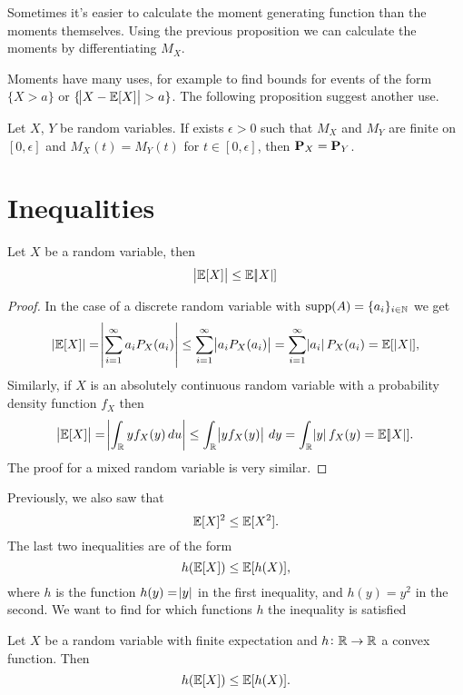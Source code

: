 \documentclass[11pt,a4paper]{article}
\begin{document}
  \begin{remark}
    Sometimes it's easier to calculate the moment generating function than
    the moments themselves. Using the previous proposition we can calculate
    the moments by differentiating $M_X$.
  \end{remark}

  Moments have many uses, for example to find bounds for events of the
  form $\{X > a\}$ or $\{\abs{X - \mathbb{E}[X]} > a\}$. The following
  proposition suggest another use.

  \begin{proposition}
    Let $X$, $Y$ be random variables. If exists $\epsilon > 0$ such that 
    $M_X$ and $M_Y$ are finite on $[0,\epsilon]$ and $M_X(t) = M_Y(t)$
    for $t \in [0,\epsilon]$, then $\mathbf{P}_X = \mathbf{P}_Y$.
  \end{proposition}

  \newpage

  \section{Inequalities}
  \begin{proposition}
    Let $X$ be a random variable, then
    \[
      \abs{\mathbb{E}[X]} \le \mathbb{E}[\abs{X}]
    \]
  \end{proposition}
  \begin{proof}
  In the case of a discrete random variable with 
  $\operatorname{supp}(A) = \{a_i\}_{i \in \mathbb{N}}$ we get
    \[
      |\mathbb{E}[X]|=
      \abs{\sum_{i=1}^{\infty} a_{i} P_{X}(a_{i})} \leq
      \sum_{i=1}^{\infty} \abs{a_{i} P_{X}(a_{i})} =
      \sum_{i=1}^{\infty} \abs{a_{i}} P_{X}(a_{i}) =
      \mathbb{E}[|X|],
    \]
    Similarly, if $X$ is an absolutely continuous random variable with
    a probability density function $f_X$ then
    \[
      \abs{\mathbb{E}[X]} =
      \abs{\int_{\mathbb{R}}y f_{X}(y)\,du} \leq
      \int_{\mathbb{R}} \abs{y f_{X}(y)}\,dy =
      \int_{\mathbb{R}} \abs{y} f_{X}(y) =
      \mathbb{E}[\abs{X}].
    \]
    The proof for a mixed random variable is very similar.
  \end{proof}

  Previously, we also saw that
  \[
    \mathbb{E}[X]^{2} \leq \mathbb{E}[X^{2}].
  \]
  The last two inequalities are of the form
  \[
    h(\mathbb{E}[X])\leq\mathbb{E}[h(X)],
  \]
  where $h$ is the function $h(y) = \abs{y}$ in the first inequality, and
  $h(y) = y^2$ in the second.
  We want to find for which functions $h$ the inequality is satisfied

  \begin{theorem}
    Let $X$ be a random variable with finite expectation and 
    $h \colon \mathbb{R} \to \mathbb{R}$ a convex function. Then
    \[
      h(\mathbb{E}[X])\leq\mathbb{E}[h(X)].
    \]
  \end{theorem}
\end{document}
